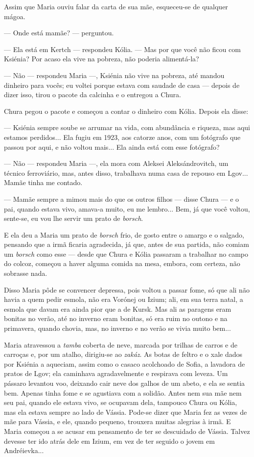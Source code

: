 Assim que Maria ouviu falar da carta de sua mãe, esqueceu-se de qualquer
mágoa.

--- Onde está mamãe? --- perguntou.

--- Ela está em Kertch --- respondeu Kólia. --- Mas por que você não
ficou com Ksiénia? Por acaso ela vive na pobreza, não poderia
alimentá-la?

--- Não --- respondeu Maria ---, Ksiénia não vive na pobreza, até mandou
dinheiro para vocês; eu voltei porque estava com saudade de casa ---
depois de dizer isso, tirou o pacote da calcinha e o entregou a Chura.

Chura pegou o pacote e começou a contar o dinheiro com Kólia. Depois ela
disse:

--- Ksiénia sempre soube se arrumar na vida, com abundância e riqueza,
mas aqui estamos perdidos... Ela fugiu em 1923, aos catorze anos, com um
fotógrafo que passou por aqui, e não voltou mais... Ela ainda está com
esse fotógrafo?

--- Não --- respondeu Maria ---, ela mora com Aleksei Aleksándrovitch,
um técnico ferroviário, mas, antes disso, trabalhava numa casa de
repouso em Lgov... Mamãe tinha me contado.

--- Mamãe sempre a mimou mais do que os outros filhos --- disse Chura
--- e o pai, quando estava vivo, amava-a muito, eu me lembro... Bem, já
que você voltou, sente-se, eu vou lhe servir um prato de \emph{borsch}.

E ela deu a Maria um prato de \emph{borsch} frio, de gosto entre o
amargo e o salgado, pensando que a irmã ficaria agradecida, já que,
antes de sua partida, não comiam um \emph{borsch} como esse --- desde
que Chura e Kólia passaram a trabalhar no campo do colcoz, começou a
haver alguma comida na mesa, embora, com certeza, não sobrasse nada.

Disso Maria pôde se convencer depressa, pois voltou a passar fome, só
que ali não havia a quem pedir esmola, não era Vorónej ou Izium; ali, em
sua terra natal, a esmola que davam era ainda pior que a de Kursk. Mas
ali as paragens eram bonitas no verão, até no inverno eram bonitas, só
era ruim no outono e na primavera, quando chovia, mas, no inverno e no
verão se vivia muito bem...

Maria atravessou a \emph{tamba} coberta de neve, marcada por trilhas de
carros e de carroças e, por um atalho, dirigiu-se ao \emph{zakáz}. As
botas de feltro e o xale dados por Ksiénia a aqueciam, assim como o
casaco acolchoado de Sofia, a lavadora de pratos de Lgov; ela caminhava
agradavelmente e respirava com leveza. Um pássaro levantou voo, deixando
cair neve dos galhos de um abeto, e ela se sentia bem. Apenas tinha fome
e se agustiava com a solidão. Antes nem sua mãe nem seu pai, quando ele
estava vivo, se ocupavam dela, tampouco Chura ou Kólia, mas ela estava
sempre ao lado de Vássia. Pode-se dizer que Maria fez as vezes de mãe
para Vássia, e ele, quando pequeno, trouxera muitas alegrias à irmã. E
Maria começou a se acusar em pensamento de ter se descuidado de Vássia.
Talvez devesse ter ido atrás dele em Izium, em vez de ter seguido o
jovem em Andréievka...

